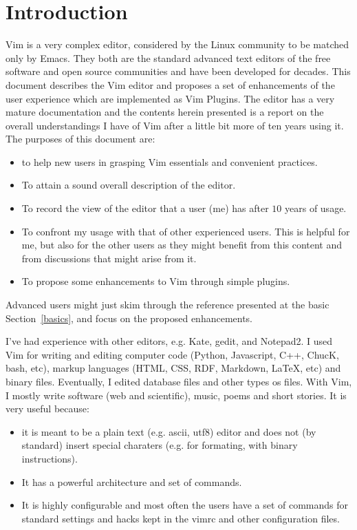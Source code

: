 \documentclass{article}
\begin{document}
\section{Introduction}
Vim is a very complex editor,
considered by the Linux community to be
matched only by Emacs.
They both are the standard advanced text editors
of the free software and open source communities
and have been developed for decades.
This document describes the Vim editor
and proposes a set of enhancements of the user
experience which
are implemented as Vim Plugins.
The editor has a very mature documentation
and the contents herein presented is a
report on the overall understandings I
have of Vim after a little bit more
of ten years using it.
The purposes of this document are:
\begin{itemize}
  \item to help new users in grasping Vim essentials
  and convenient practices.
  \item To attain a sound overall description of the editor.
  \item To record the view of the editor that
  a user (me) has after $10$ years of usage.
  \item To confront my usage with that of other experienced
  users. This is helpful for me, but also for the other users
  as they might benefit from this content and from discussions
  that might arise from it.
  \item To propose some enhancements to Vim through simple plugins.
\end{itemize}

Advanced users might just skim through the reference presented
at the basic Section~\ref{basics},
and focus on the proposed enhancements.

I've had experience with other editors, e.g. Kate, gedit, and Notepad2.
I used Vim for writing and editing computer code (Python, Javascript, C++, ChucK, bash, etc), markup languages (HTML, CSS, RDF, Markdown, \LaTeX, etc) and binary files.
Eventually, I edited database files and other types os files.
With Vim, I mostly write software (web and scientific),
music, poems and short stories.
It is very useful because:
\begin{itemize}
  \item it is meant to be a plain text (e.g. ascii, utf8) editor
  and does not (by standard) insert special charaters (e.g. for formating, with binary instructions).
  \item It has a powerful architecture and set of commands.
  \item It is highly configurable and most often the users
  have a set of commands for standard settings and hacks kept in the vimrc and other configuration files.
\end{itemize}
\end{document}
